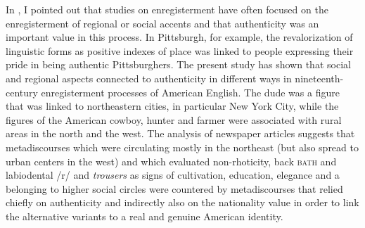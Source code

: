 In , I pointed out that studies on enregisterment have often focused on the enregisterment of regional or social accents and that authenticity was an important value in this process. In Pittsburgh, for example, the revalorization of linguistic forms as positive indexes of place was linked to people expressing their pride in being authentic Pittsburghers. The present study has shown that social and regional aspects connected to authenticity in different ways in nineteenth-century enregisterment processes of American English. The dude was a figure that was linked to northeastern cities, in particular New York City, while the figures of the American cowboy, hunter and farmer were associated with rural areas in the north and the west. The analysis of newspaper articles suggests that metadiscourses which were circulating mostly in the northeast (but also spread to urban centers in the west) and which evaluated non-rhoticity, back \textsc{bath} and labiodental /r/ and \emph{trousers} as signs of cultivation, education, elegance and a belonging to higher social circles were countered by metadiscourses that relied chiefly on authenticity and indirectly also on the nationality value in order to link the alternative variants to a real and genuine American identity.

